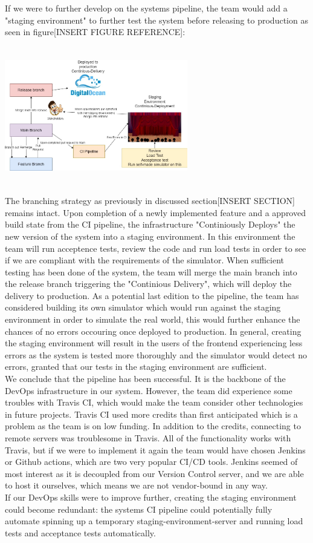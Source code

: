 If we were to further develop on the systems pipeline, the team would add a "staging environment" to further test the system before releasing to production as seen in figure[INSERT FIGURE REFERENCE]:


\includegraphics[width=8cm, height=6cm]{images/image.PNG}

The branching strategy as previously in discussed section[INSERT SECTION] remains intact. Upon completion of a newly implemented feature and a approved build state from the CI pipeline, the infrastructure "Continiously Deploys" the new version of the system into a staging environment. In this environment the team will run acceptence tests, review the code and run load tests in order to see if we are compliant with the requirements of the simulator. When sufficient testing has been done of the system, the team will merge the main branch into the release branch triggering the "Continious Delivery", which will deploy the delivery to production. As a potential last edition to the pipeline, the team has considered building its own simulator which would run against the staging environment in order to simulate the real world, this would further enhance the chances of no errors occouring once deployed to production. In general, creating the staging environment will result in the users of the frontend experiencing less errors as the system is tested more thoroughly and the simulator would detect no errors, granted that our tests in the staging environment are sufficient.\\ 

We conclude that the pipeline has been successful. It is the backbone of the DevOps infrastructure in our system. However, the team did experience some troubles with Travis CI, which would make the team consider other technologies in future projects. Travis CI used more credits than first anticipated which is a problem as the team is on low funding. In addition to the credits, connecting to remote servers was troublesome in Travis. All of the functionality works with Travis, but if we were to implement it again the team would have chosen Jenkins or Github actions, which are two very popular CI/CD tools. Jenkins seemed of most interest as it is decoupled from our Version Control server, and we are able to host it ourselves, which means we are not vendor-bound in any way.\\

If our DevOps skills were to improve further, creating the staging environment could become redundant: the systems CI pipeline could potentially fully automate spinning up a temporary staging-environment-server and running load tests and acceptance tests automatically.
